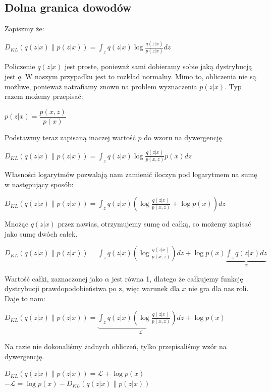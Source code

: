 \documentclass[a4paper,12pt]{book} %
\begin{document}
\subsection{Dolna granica dowodów}
Zapiszmy że:
\begin{center}
	$D_{KL}(q(z|x)\|p(z|x))=\displaystyle\int_{z}^{}q(z|x)\log\frac{q(z|x)}{p(z|x)}dz$
\end{center}
Policzenie $q(z|x)$ jest proste, ponieważ sami dobieramy sobie jaką dystrybucją jest $q$. W naszym przypadku jest to rozkład normalny. Mimo to, obliczenia nie są możliwe, ponieważ natrafiamy znowu na problem wyznaczenia $p(z|x)$. Typ razem możemy przepisać:
\begin{center}
	$p(z|x)=\dfrac{p(x,z)}{p(x)}$
\end{center}
Podstawmy teraz zapisaną inaczej wartość $p$ do wzoru na dywergencję.
\begin{center}
	$D_{KL}(q(z|x)\|p(z|x))=\displaystyle\int_{z}^{}q(z|x)\log\frac{q(z|x)}{p(x,z)}p(x)dz$
\end{center}
Własności logarytmów pozwalają nam zamienić iloczyn pod logarytmem na sumę w następujący sposób:
\begin{center}
	$D_{KL}(q(z|x)\|p(z|x))=\displaystyle\int_{z}^{}q(z|x)\left( \log\frac{q(z|x)}{p(x,z)} + \log p(x)\right) dz$
\end{center}
Mnożąc $q(z|x)$ przez nawias, otrzymujemy sumę od całką, co możemy zapisać jako sumę dwóch całek.
\begin{center}
	$D_{KL}(q(z|x)\|p(z|x))=\displaystyle\int_{z}^{}q(z|x)\left( \log\frac{q(z|x)}{p(x,z)}\right)dz + \log p(x)\underbrace{\displaystyle\int_{z}^{}q(z|x)dz}_{\text{$\alpha$}}$
\end{center}
Wartość całki, zaznaczonej jako $\alpha$ jest równa 1, dlatego że całkujemy funkcję dystrybucji prawdopodobieństwa po z, więc warunek dla $x$ nie gra dla nas roli. Daje to nam:
\begin{center}
	$D_{KL}(q(z|x)\|p(z|x))=\underbrace{\displaystyle\int_{z}^{}q(z|x)\left( \log\frac{q(z|x)}{p(x,z)}\right)dz}_{\text{$\mathcal{L}$}} + \log p(x)$
\end{center}
Na razie nie dokonaliśmy żadnych obliczeń, tylko przepisaliśmy wzór na dywergencję.
\begin{center}
	$D_{KL}(q(z|x)\|p(z|x))= \mathcal{L} + \log p(x)$\\
	$-\mathcal{L} = \log p(x) - D_{KL}(q(z|x)\|p(z|x))$
\end{center}
\end{document}
